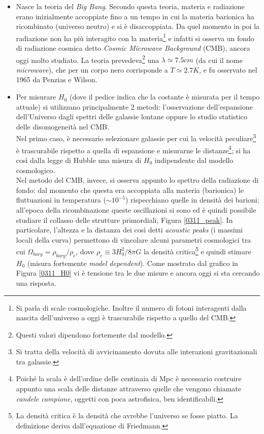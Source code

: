 \begin{itemize}
    \item Nasce la teoria del \textit{Big Bang}. Secondo questa teoria, materia e radiazione erano inizialmente accoppiate fino a un tempo in cui la materia barionica ha ricombinato (universo neutro) e si è disaccoppiata. Da quel momento in poi la radiazione non ha più interagito con la materia\footnote{Si parla di scale cosmologiche. Inoltre il numero di fotoni interagenti dalla nascita dell'universo a oggi è trascurabile rispetto a quello del CMB.} e infatti si osserva un fondo di radiazione cosmica detto \textit{Cosmic Microwave Background} (CMB), ancora oggi molto studiato. La teoria prevedeva\footnote{Questi valori dipendono fortemente dal modello.} una $\lambda\simeq 7.5\unit{cm}$ (da cui il nome \textit{microwave}), che per un corpo nero corrisponde a $T\simeq 2.7\unit{K}$, e fu osservato nel 1965 da Penzias e Wilson. 
    \item Per misurare $H_0$ (dove il pedice indica che la costante è misurata per il tempo attuale) si utilizzano principalmente 2 metodi: l'osservazione dell'espansione dell'Universo dagli spettri delle galassie lontane oppure lo studio statistico delle disomogeneità nel CMB.\\ 
    Nel primo caso, è necessario selezionare galassie per cui la velocità peculiare\footnote{Si tratta della velocità di avvicinamento dovuta alle interazioni gravitazionali tra galassie.} è trascurabile rispetto a quella di espansione e misurarne le distanze\footnote{Poiché la scala è dell'ordine delle centinaia di Mpc è necessario costruire appunto una scala delle distanze attraverso quelle che vengono chiamate \textit{candele campione}, oggetti con poca astrofisica, ben identificabili.}; si ha così dalla legge di Hubble una misura di $H_0$ indipendente dal modello cosmologico.\\ 
    Nel metodo del CMB, invece, si osserva appunto lo spettro della radiazione di fondo: dal momento che questa era accoppiata alla materia (barionica) le fluttuazioni in temperatura ($\sim 10^{-5}$) rispecchiano quelle in densità dei barioni; all'epoca della ricombinazione queste oscillazioni si sono  ed è quindi possibile studiare il collasso delle strutture primordiali, Figura \ref{0311_peak}. In particolare, l'altezza e la distanza dei così detti \textit{acoustic peaks} (i massimi locali della curva) permettono di vincolare alcuni parametri cosmologici tra cui $\Omega_{bary} = \rho_{bary}/\rho_c$, dove $\rho_c\equiv 3H_0^2/8\pi G$ la densità critica\footnote{La densità critica è la densità che avrebbe l'universo se fosse piatto. La definizione deriva dall'equazione di Friedmann.} e quindi stimare $H_0$ (misura fortemente \textit{model dependent}). Come mostrato dal grafico in Figura \ref{0311_H0} vi è tensione tra le due misure e ancora oggi si sta cercando una risposta.

\end{itemize}
